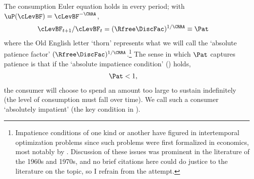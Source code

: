 \documentclass[BufferStockTheory]{subfiles}
\begin{document}
\hypertarget{APF}{}
\hypertarget{AIC}{}
The consumption Euler equation holds in every period; with $\uP(\cLevBF)=\cLevBF^{-\CRRA}$, \hypertarget{Pat}{}
\begin{equation}\begin{gathered}\begin{aligned}
  \cLevBF_{t+1}/\cLevBF_{t}  & = (\Rfree\DiscFac)^{1/\CRRA} \equiv \Pat   \label{eq:Pat}
\end{aligned}\end{gathered}\end{equation}
where the Old English letter `thorn' represents what we will call the
`absolute patience factor' $(\Rfree
\DiscFac)^{1/\CRRA}$.\footnote{Impatience conditions of one kind or
  another have figured in intertemporal optimization problems since
  such problems were first formalized in economics, most notably by \cite{ramseySave}.
  Discussion of these issues was prominent in the literature of the
  1960s and 1970s, and no brief citations here could do justice to the literature on the topic, so I refrain from the attempt.}  The sense in which $\Pat$ captures
patience is that if the `absolute impatience condition' (\AIC) holds,
\begin{equation}\begin{gathered}\begin{aligned}
  \label{eq:AIC}
  \Pat  & < 1,
\end{aligned}\end{gathered}\end{equation}
the consumer will choose to spend an amount too large to sustain indefinitely (the
level of consumption must fall over time).  We call such a consumer `absolutely impatient' (the key condition in \cite{bewleyPIH}).
\end{document}
